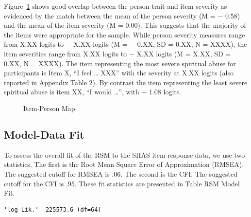 \documentclass[
  letterpaper,
]{article}
\begin{document}
Figure~\ref{fig-RSM-WrightMap} shows good overlap between the person
trait and item severity as evidenced by the match between the mean of
the person severity (M = − 0.58) and the mean of the item severity (M =
0.00). This suggests that the majority of the items were appropriate for
the sample. While person severity measures range from X.XX logits to −
X.XX logits (M = − 0.XX, SD = 0.XX, N = XXXX), the item severities range
from X.XX logits to − X.XX logits (M = X.XX, SD = 0.XX, N = XXXX). The
item representing the most severe spiritual abuse for participants is
Item X, ``I feel \ldots{} XXX'' with the severity at X.XX logits (also
reported in Appendix Table 2). By contrast the item representing the
least severe spiritual abuse is item XX, ``I would \ldots{}'', with −
1.08 logits.

\begin{figure}


\caption{\label{fig-RSM-WrightMap}Item-Person Map}

\end{figure}%

\subsection*{Model-Data Fit}\label{model-data-fit}

To assess the overall fit of the RSM to the SHAS item response data, we
use two statistics. The first is the Root Mean Square Error of
Approximation (RMSEA). The suggested cutoff for RMSEA is .06. The second
is the CFI. The suggested cutoff for the CFI is .95. These fit
statistics are presented in Table RSM Model Fit.

\begin{verbatim}
'log Lik.' -225573.6 (df=64)
\end{verbatim}
\end{document}
